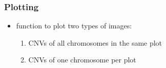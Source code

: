 \documentclass[letterpaper,10pt,english]{sphinxhowto}
\begin{document}
\subsubsection{Plotting}
\label{\detokenize{index:plotting}}\begin{itemize}
\item {} 
\sphinxAtStartPar
function to plot two types of images:
\begin{enumerate}
%
\item {} 
\sphinxAtStartPar
CNVs of all chromosomes in the same plot

\item {} 
\sphinxAtStartPar
CNVs of one chromosome per plot

\end{enumerate}

\end{itemize}
\end{document}
